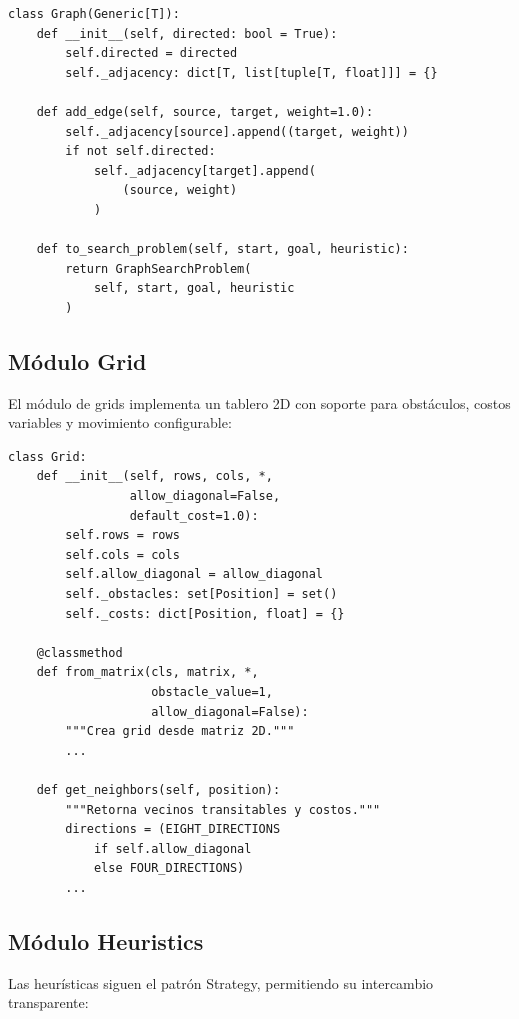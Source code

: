 \begin{lstlisting}[caption={Grafo ponderado con adaptador a SearchProblem}, label={lst:graph}]
class Graph(Generic[T]):
    def __init__(self, directed: bool = True):
        self.directed = directed
        self._adjacency: dict[T, list[tuple[T, float]]] = {}

    def add_edge(self, source, target, weight=1.0):
        self._adjacency[source].append((target, weight))
        if not self.directed:
            self._adjacency[target].append(
                (source, weight)
            )

    def to_search_problem(self, start, goal, heuristic):
        return GraphSearchProblem(
            self, start, goal, heuristic
        )
\end{lstlisting}

\subsection{Módulo Grid}

El módulo de grids implementa un tablero 2D con soporte para obstáculos, costos variables y movimiento configurable:

\begin{lstlisting}[caption={Grid 2D con obstáculos y costos variables}, label={lst:grid}]
class Grid:
    def __init__(self, rows, cols, *,
                 allow_diagonal=False,
                 default_cost=1.0):
        self.rows = rows
        self.cols = cols
        self.allow_diagonal = allow_diagonal
        self._obstacles: set[Position] = set()
        self._costs: dict[Position, float] = {}

    @classmethod
    def from_matrix(cls, matrix, *,
                    obstacle_value=1,
                    allow_diagonal=False):
        """Crea grid desde matriz 2D."""
        ...

    def get_neighbors(self, position):
        """Retorna vecinos transitables y costos."""
        directions = (EIGHT_DIRECTIONS 
            if self.allow_diagonal 
            else FOUR_DIRECTIONS)
        ...
\end{lstlisting}

\subsection{Módulo Heuristics}

Las heurísticas siguen el patrón Strategy, permitiendo su intercambio transparente:


